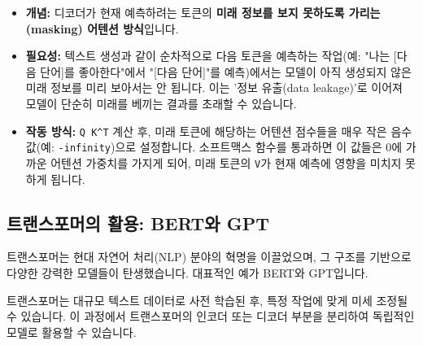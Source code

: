 \documentclass[11pt,a4paper]{article}
\theoremstyle{definition}
\begin{document}
\begin{tcolorbox}[mybox, title={마스크드 멀티 헤드 어텐션의 목적}]
\begin{itemize}
    \item \textbf{개념:} 디코더가 현재 예측하려는 토큰의 \textbf{미래 정보를 보지 못하도록 가리는(masking) 어텐션 방식}입니다.
    \item \textbf{필요성:} 텍스트 생성과 같이 순차적으로 다음 토큰을 예측하는 작업(예: "나는 [다음 단어]를 좋아한다"에서 "[다음 단어]"를 예측)에서는 모델이 아직 생성되지 않은 미래 정보를 미리 보아서는 안 됩니다. 이는 '정보 유출(data leakage)'로 이어져 모델이 단순히 미래를 베끼는 결과를 초래할 수 있습니다.
    \item \textbf{작동 방식:} \texttt{Q K^T} 계산 후, 미래 토큰에 해당하는 어텐션 점수들을 매우 작은 음수 값(예: \texttt{-infinity})으로 설정합니다. 소프트맥스 함수를 통과하면 이 값들은 0에 가까운 어텐션 가중치를 가지게 되어, 미래 토큰의 \texttt{V}가 현재 예측에 영향을 미치지 못하게 됩니다.
\end{itemize}
\end{tcolorbox}

\subsection{트랜스포머의 활용: BERT와 GPT}
트랜스포머는 현대 자연어 처리(NLP) 분야의 혁명을 이끌었으며, 그 구조를 기반으로 다양한 강력한 모델들이 탄생했습니다. 대표적인 예가 BERT와 GPT입니다.

\begin{tcolorbox}[mybox, title={트랜스포머를 찢어 활용하기}]
트랜스포머는 대규모 텍스트 데이터로 사전 학습된 후, 특정 작업에 맞게 미세 조정될 수 있습니다. 이 과정에서 트랜스포머의 인코더 또는 디코더 부분을 분리하여 독립적인 모델로 활용할 수 있습니다.
\end{tcolorbox}
\end{document}
